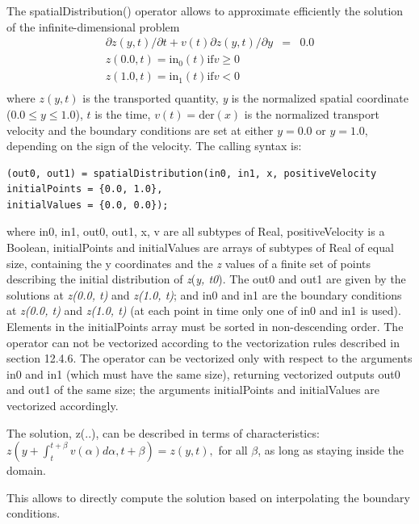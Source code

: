 \documentclass[10pt,a4paper]{report}
\begin{document}
The spatialDistribution() operator allows to approximate efficiently the
solution of the infinite-dimensional problem
\begin{eqnarray*}
\partial z(y,t)/\partial t+v(t)\partial z(y,t)/\partial y&=&0.0\\
z(0.0, t)=\mathrm{in}_0(t) \mathrm{if} v \ge 0\\
z(1.0, t)=\mathrm{in}_1(t) \mathrm{if} v < 0\\
\end{eqnarray*}
where $z(y, t)$ is the transported quantity, \emph{y} is the
normalized spatial coordinate ($0.0 \le y \le 1.0$), $t$ is the
time, $v(t)=\mathrm{der}(x)$ is the normalized
transport velocity and the boundary conditions are set at either
$y=0.0$ or $y=1.0$, depending on the sign of the velocity.
The calling syntax is:
\begin{lstlisting}[language=modelica]
(out0, out1) = spatialDistribution(in0, in1, x, positiveVelocity
initialPoints = {0.0, 1.0},
initialValues = {0.0, 0.0});
\end{lstlisting}
where in0, in1, out0, out1, x, v are all subtypes of Real,
positiveVelocity is a Boolean, initialPoints and initialValues are
arrays of subtypes of Real of equal size, containing the y coordinates
and the \emph{z} values of a finite set of points describing the initial
distribution of \emph{z}(\emph{y, t0}). The out0 and out1 are given by
the solutions at \emph{z(0.0, t)} and \emph{z(1.0, t)}; and in0 and in1
are the boundary conditions at \emph{z(0.0, t)} and \emph{z(1.0, t)} (at
each point in time only one of in0 and in1 is used). Elements in the
initialPoints array must be sorted in non-descending order. The operator
can not be vectorized according to the vectorization rules described in
section 12.4.6. The operator can be vectorized only with respect to the
arguments in0 and in1 (which must have the same size), returning
vectorized outputs out0 and out1 of the same size; the arguments
initialPoints and initialValues are vectorized accordingly.

The solution, z(..), can be described in terms of characteristics:
$z(y+\int_t^{t+\beta}v(\alpha)d\alpha,t+\beta)=z(y,t),$ for all $\beta$, as long as staying inside the
domain.

This allows to directly compute the solution based on interpolating the
boundary conditions.
\end{document}
